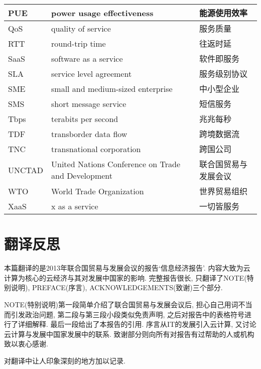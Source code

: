 \documentclass[a4paper, UTF8, 12pt]{article}
\begin{document}
\begin{longtable}{lm{8cm}m{5cm}}
    \hline
    PUE & power usage effectiveness & 能源使用效率\\
    \hline
    QoS & quality of service & 服务质量\\
    \hline
    RTT & round-trip time & 往返时延\\
    \hline
    SaaS & software as a service & 软件即服务\\
    \hline
    SLA & service level agreement & 服务级别协议\\ 
    \hline
    SME & small and medium-sized enterprise & 中小型企业\\
    \hline
    SMS & short message service & 短信服务\\
    \hline
    Tbps & terabits per second & 兆兆每秒\\
    \hline
    TDF & transborder data flow & 跨境数据流\\ 
    \hline
    TNC & transnational corporation & 跨国公司\\
    \hline
    UNCTAD & United Nations Conference on Trade and Development & 联合国贸易与发展会议\\
    \hline
    WTO & World Trade Organization & 世界贸易组织\\
    \hline
    XaaS & x as a service & 一切皆服务\\
    \hline
\end{longtable}

\section{翻译反思}

本篇翻译的是2013年联合国贸易与发展会议的报告`信息经济报告'. 内容大致为云计算为核心的云经济与其对发展中国家的影响. 完整报告很长, 只翻译了NOTE(特别说明), PREFACE(序言), ACKNOWLEDGEMENTS(致谢)三个部分. 

NOTE(特别说明)第一段简单介绍了联合国贸易与发展会议后, 担心自己用词不当而引发政治问题, 第二段与第三段小段类似免责声明, 之后对报告中的表格符号进行了详细解释. 最后一段给出了本报告的引用. 序言从IT的发展引入云计算, 又讨论云计算与发展中国家发展中的联系. 致谢部分则向所有对报告有过帮助的人或机构致以衷心感谢.

对翻译中让人印象深刻的地方加以记录.
\end{document}
